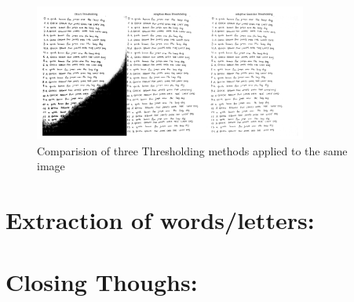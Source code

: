 \documentclass[twoside,a4paper]{article}
\begin{document}
\begin{figure}[H]
  \centering
  \includegraphics[width=0.8\textwidth]{Comparison_Thre.png}
  \caption{Comparision of three Thresholding methods applied to the same image}
  \label{fig:thresholding_filters}
\end{figure}


\section{Extraction of words/letters: }
\section{Closing Thoughs: }
\printbibliography
\end{document}
